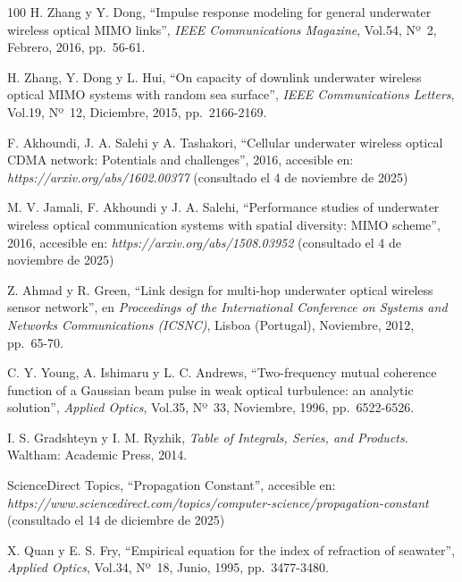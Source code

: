 \begin{thebibliography}{100}
H. Zhang y Y. Dong,
``Impulse response modeling for general underwater wireless optical MIMO links'',
\textit{IEEE Communications Magazine},
Vol.54, Nº~2, Febrero, 2016, pp.~56-61.


H. Zhang, Y. Dong y L. Hui,
``On capacity of downlink underwater wireless optical MIMO systems with random sea surface'',
\textit{IEEE Communications Letters},
Vol.19, Nº~12, Diciembre, 2015, pp.~2166-2169.

F. Akhoundi, J. A. Salehi y A. Tashakori,
``Cellular underwater wireless optical CDMA network: Potentials and challenges'', 2016, accesible en: \textit{https://arxiv.org/abs/1602.00377}
(consultado el 4 de noviembre de 2025)

M. V. Jamali, F. Akhoundi y J. A. Salehi,
``Performance studies of underwater wireless optical communication systems with spatial diversity: MIMO scheme'', 2016, accesible en: \textit{https://arxiv.org/abs/1508.03952}
(consultado el 4 de noviembre de 2025)

Z. Ahmad y R. Green,
``Link design for multi-hop underwater optical wireless sensor network'',
en \textit{Proceedings of the International Conference on Systems and Networks Communications (ICSNC)},
Lisboa (Portugal), Noviembre, 2012, pp.~65-70.

C. Y. Young, A. Ishimaru y L. C. Andrews,
``Two-frequency mutual coherence function of a Gaussian beam pulse in weak optical turbulence: an analytic solution'',
\textit{Applied Optics},
Vol.35, Nº~33, Noviembre, 1996, pp.~6522-6526.

I. S. Gradshteyn y I. M. Ryzhik,
\textit{Table of Integrals, Series, and Products}.
Waltham: Academic Press, 2014.

ScienceDirect Topics,
``Propagation Constant'', accesible en:
\textit{https://www.sciencedirect.com/topics/computer-science/propagation-constant}
(consultado el 14 de diciembre de 2025)

X. Quan y E. S. Fry,
``Empirical equation for the index of refraction of seawater'',
\textit{Applied Optics},
Vol.34, Nº~18, Junio, 1995, pp.~3477-3480.



\end{thebibliography}


\chapterend
